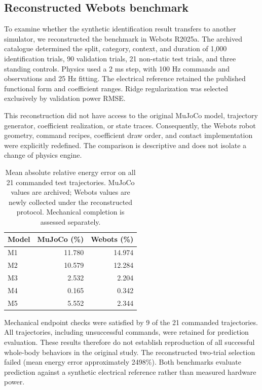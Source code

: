 \subsection{Reconstructed Webots benchmark}
To examine whether the synthetic identification result transfers to another simulator, we reconstructed the benchmark in Webots R2025a. The archived catalogue determined the split, category, context, and duration of 1,000 identification trials, 90 validation trials, 21 non-static test trials, and three standing controls. Physics used a 2 ms step, with 100 Hz commands and observations and 25 Hz fitting. The electrical reference retained the published functional form and coefficient ranges. Ridge regularization was selected exclusively by validation power RMSE.

This reconstruction did not have access to the original MuJoCo model, trajectory generator, coefficient realization, or state traces. Consequently, the Webots robot geometry, command recipes, coefficient draw order, and contact implementation were explicitly redefined. The comparison is descriptive and does not isolate a change of physics engine.

\begin{table}[t]\centering
\caption{Mean absolute relative energy error on all 21 commanded test trajectories. MuJoCo values are archived; Webots values are newly collected under the reconstructed protocol. Mechanical completion is assessed separately.}
\begin{tabular}{lrr}\hline
Model & MuJoCo (\%) & Webots (\%)\\\hline
M1 & 11.780 & 14.974\\
M2 & 10.579 & 12.284\\
M3 & 2.532 & 2.204\\
M4 & 0.165 & 0.342\\
M5 & 5.552 & 2.344\\
\hline\end{tabular}\end{table}

Mechanical endpoint checks were satisfied by 9 of the 21 commanded trajectories. All trajectories, including unsuccessful commands, were retained for prediction evaluation. These results therefore do not establish reproduction of all successful whole-body behaviors in the original study. The reconstructed two-trial selection failed (mean energy error approximately 2498\%). Both benchmarks evaluate prediction against a synthetic electrical reference rather than measured hardware power.
